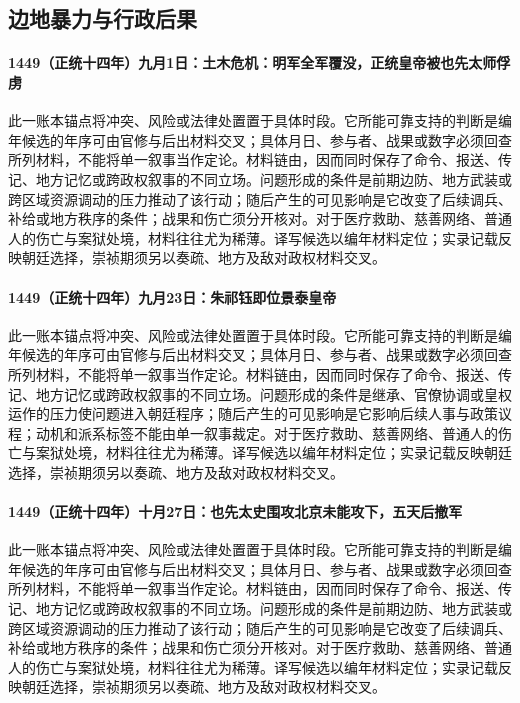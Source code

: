 \subsection{边地暴力与行政后果}

\paragraph{1449（正统十四年）九月1日：土木危机：明军全军覆没，正统皇帝被也先太师俘虏} 此一账本锚点将冲突、风险或法律处置置于具体时段。它所能可靠支持的判断是编年候选的年序可由官修与后出材料交叉；具体月日、参与者、战果或数字必须回查所列材料，不能将单一叙事当作定论。材料链由，因而同时保存了命令、报送、传记、地方记忆或跨政权叙事的不同立场。问题形成的条件是前期边防、地方武装或跨区域资源调动的压力推动了该行动；随后产生的可见影响是它改变了后续调兵、补给或地方秩序的条件；战果和伤亡须分开核对。对于医疗救助、慈善网络、普通人的伤亡与案狱处境，材料往往尤为稀薄。译写候选以编年材料定位；实录记载反映朝廷选择，崇祯期须另以奏疏、地方及敌对政权材料交叉。

\paragraph{1449（正统十四年）九月23日：朱祁钰即位景泰皇帝} 此一账本锚点将冲突、风险或法律处置置于具体时段。它所能可靠支持的判断是编年候选的年序可由官修与后出材料交叉；具体月日、参与者、战果或数字必须回查所列材料，不能将单一叙事当作定论。材料链由，因而同时保存了命令、报送、传记、地方记忆或跨政权叙事的不同立场。问题形成的条件是继承、官僚协调或皇权运作的压力使问题进入朝廷程序；随后产生的可见影响是它影响后续人事与政策议程；动机和派系标签不能由单一叙事裁定。对于医疗救助、慈善网络、普通人的伤亡与案狱处境，材料往往尤为稀薄。译写候选以编年材料定位；实录记载反映朝廷选择，崇祯期须另以奏疏、地方及敌对政权材料交叉。

\paragraph{1449（正统十四年）十月27日：也先太史围攻北京未能攻下，五天后撤军} 此一账本锚点将冲突、风险或法律处置置于具体时段。它所能可靠支持的判断是编年候选的年序可由官修与后出材料交叉；具体月日、参与者、战果或数字必须回查所列材料，不能将单一叙事当作定论。材料链由，因而同时保存了命令、报送、传记、地方记忆或跨政权叙事的不同立场。问题形成的条件是前期边防、地方武装或跨区域资源调动的压力推动了该行动；随后产生的可见影响是它改变了后续调兵、补给或地方秩序的条件；战果和伤亡须分开核对。对于医疗救助、慈善网络、普通人的伤亡与案狱处境，材料往往尤为稀薄。译写候选以编年材料定位；实录记载反映朝廷选择，崇祯期须另以奏疏、地方及敌对政权材料交叉。

